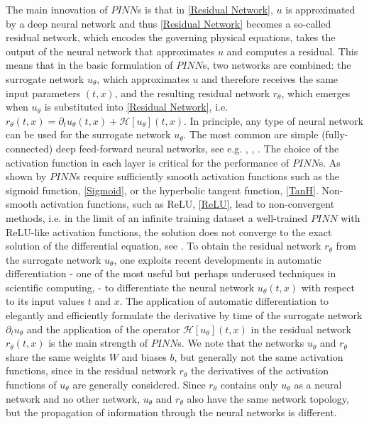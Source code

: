 The main innovation of $PINN$s is that in \cref{Residual Network}, $u$ is approximated by a deep neural network and thus \cref{Residual Network} becomes a so-called residual network, which encodes the governing physical equations, takes the output of the neural network that approximates $u$ and computes a residual. This means that in the basic formulation of $PINN$s, two networks are combined: the surrogate network $u_\theta$, which approximates $u$ and therefore receives the same input parameters $(t,x)$, and the resulting residual network $r_\theta$, which emerges when $u_\theta$ is substituted into \cref{Residual Network}, i.e. $r_\theta(t,x) = \partial_t u_\theta (t,x) + \mathcal{H} \left[ u_\theta \right] (t, x)$. In principle, any type of neural network can be used for the surrogate network $u_\theta$. The most common are simple (fully-connected) deep feed-forward neural networks, see e.g. \cite{RaissiPerdikarisKarniadakis:2019}, \cite{BlechschmidtErnst:2021}, \cite{Markidis:2021}. The choice of the activation function in each layer is critical for the performance of $PINN$s. As shown by \cite{MishraMolinaro:2021} $PINN$s require sufficiently smooth activation functions such as the sigmoid function, \cref{Sigmoid}, or the hyperbolic tangent function, \cref{TanH}. Non-smooth activation functions, such as ReLU, \cref{ReLU}, lead to non-convergent methods, i.e. in the limit of an infinite training dataset a well-trained $PINN$ with ReLU-like activation functions, the solution does not converge to the exact solution of the differential equation, see \cite{MishraMolinaro:2021}. To obtain the residual network $r_\theta$ from the surrogate network $u_\theta$, one exploits recent developments in automatic differentiation - one of the most useful but perhaps underused techniques in scientific computing, \cite[p.~3]{RaissiPerdikarisKarniadakisPart1:2017} - to differentiate the neural network $u_\theta(t,x)$ with respect to its input values $t$ and $x$. The application of automatic differentiation to elegantly and efficiently formulate the derivative by time of the surrogate network $\partial_t u_\theta$ and the application of the operator $\mathcal{H} \left[ u_\theta \right] (t,x)$ in the residual network $r_\theta(t,x)$ is the main strength of $PINN$s. We note that the networks $u_\theta$ and $r_\theta$ share the same weights $W$ and biases $b$, but generally not the same activation functions, since in the residual network $r_\theta$ the derivatives of the activation functions of $u_\theta$ are generally considered. Since $r_\theta$ contains only $u_\theta$ as a neural network and no other network, $u_\theta$ and $r_\theta$ also have the same network topology, but the propagation of information through the neural networks is different. \\

